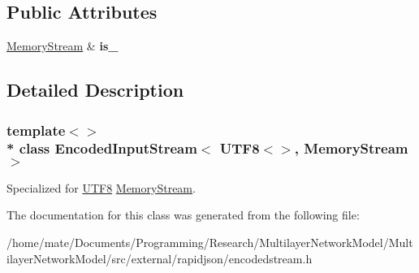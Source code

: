 \subsection*{Public Attributes}
\begin{DoxyCompactItemize}
\item 
\hyperlink{structMemoryStream}{Memory\+Stream} \& {\bfseries is\+\_\+}\hypertarget{classEncodedInputStream_3_01UTF8_3_4_00_01MemoryStream_01_4_ad5e48564bbd14297a4cc445af3a4aa83}{}\label{classEncodedInputStream_3_01UTF8_3_4_00_01MemoryStream_01_4_ad5e48564bbd14297a4cc445af3a4aa83}

\end{DoxyCompactItemize}


\subsection{Detailed Description}
\subsubsection*{template$<$$>$\\*
class Encoded\+Input\+Stream$<$ U\+T\+F8$<$$>$, Memory\+Stream $>$}

Specialized for \hyperlink{structUTF8}{U\+T\+F8} \hyperlink{structMemoryStream}{Memory\+Stream}. 

The documentation for this class was generated from the following file\+:\begin{DoxyCompactItemize}
\item 
/home/mate/\+Documents/\+Programming/\+Research/\+Multilayer\+Network\+Model/\+Multilayer\+Network\+Model/src/external/rapidjson/encodedstream.\+h\end{DoxyCompactItemize}
